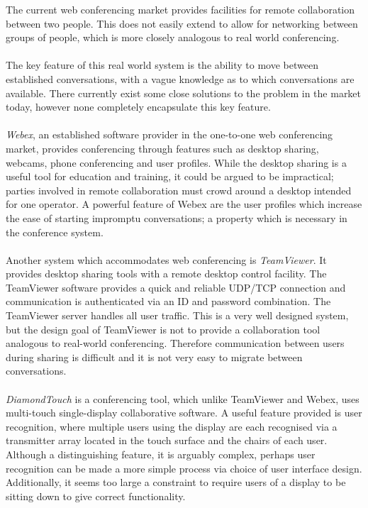 \documentclass[12p, a4paper, onecolumn]{report}
\begin{document}
The current web conferencing market provides facilities for remote collaboration between two people. This does not easily extend to allow for networking between groups of people, which is more closely analogous to real world conferencing. \\ \\
The key feature of this real world system is the ability to move between established conversations, with a vague knowledge as to which conversations are available. There currently exist some close solutions to the problem in the market today, however none completely encapsulate this key feature. \\ \\
\emph{Webex}, an established software provider in the one-to-one web conferencing market, provides conferencing through features such as desktop sharing, webcams, phone conferencing and user profiles. While the desktop sharing is a useful tool for education and training, it could be argued to be impractical; parties involved in remote collaboration must crowd around a desktop intended for one operator. A powerful feature of Webex are the user profiles which increase the ease of starting impromptu conversations; a property which is necessary in the conference system. \\ \\
Another system which accommodates web conferencing is \emph{TeamViewer}. It provides desktop sharing tools with a remote desktop control facility. The TeamViewer software provides a quick and reliable UDP/TCP connection and communication is authenticated via an ID and password combination. The TeamViewer server handles all user traffic. This is a very well designed system, but the design goal of TeamViewer is not to provide a collaboration tool analogous to real-world conferencing. Therefore communication between users during sharing is difficult and it is not very easy to migrate between conversations. \\ \\
\emph{DiamondTouch} is a conferencing tool, which unlike TeamViewer and Webex, uses multi-touch single-display collaborative software. A useful feature provided is user recognition, where multiple users using the display are each recognised via a transmitter array located in the touch surface and the chairs of each user. Although a distinguishing feature, it is arguably complex, perhaps user recognition can be made a more simple process via choice of user interface design. Additionally, it seems too large a constraint to require users of a display to be sitting down to give correct functionality. \\ \\
\end{document}
